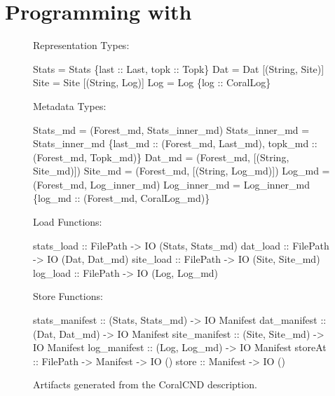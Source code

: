 \section{Programming with \forest{}}
\label{sec:exp}

\begin{figure}
%
Representation Types:
\begin{code}
 Stats = Stats \{last :: Last, topk :: Topk\}
 Dat   = Dat   [(String, Site)]
 Site  = Site  [(String, Log)]
    Log   = Log   \{log :: CoralLog\}
\end{code}
%
Metadata Types:
\begin{code}
 Stats_md = (Forest_md, Stats_inner_md)
 Stats_inner_md = Stats_inner_md 
    \{last_md :: (Forest_md, Last_md),
     topk_md :: (Forest_md, Topk_md)\}
 Dat_md   = (Forest_md, [(String, Site_md)])
 Site_md  = (Forest_md, [(String, Log_md)])
 Log_md   = (Forest_md, Log_inner_md)
 Log_inner_md = Log_inner_md 
    \{log_md :: (Forest_md, CoralLog_md)\}
\end{code}
Load Functions:
\begin{code}
stats_load :: FilePath -> IO (Stats, Stats_md)
dat_load   :: FilePath -> IO (Dat, Dat_md)
site_load  :: FilePath -> IO (Site, Site_md)
log_load   :: FilePath -> IO (Log, Log_md)
\end{code}
Store Functions:
\begin{code}
stats_manifest :: (Stats, Stats_md) -> IO Manifest
dat_manifest   :: (Dat, Dat_md)     -> IO Manifest
site_manifest  :: (Site, Site_md)   -> IO Manifest
log_manifest   :: (Log, Log_md)     -> IO Manifest\smallskip
storeAt        :: FilePath -> Manifest -> IO ()
store          ::             Manifest -> IO ()
\end{code}
\caption{Artifacts generated from the CoralCND description.}
\label{fig:coral-aux}
\end{figure}

